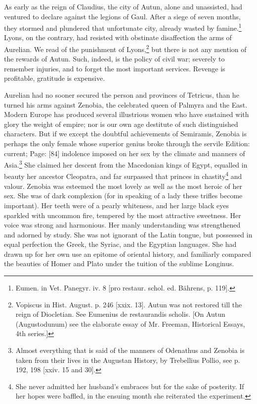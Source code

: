 As early as the reign of Claudius, the city of Autun, alone and unassisted, had ventured to declare against the legions of Gaul. After a siege of seven months, they stormed and plundered that unfortunate city, already wasted by famine.\footnote{Eumen. in Vet. Panegyr. iv. 8 [pro restaur. schol. ed. Bährens, p. 119].} Lyons, on the contrary, had resisted with obstinate disaffection the arms of Aurelian. We read of the punishment of Lyons,\footnote{Vopiscus in Hist. August. p. 246 [xxix. 13]. Autun was not restored till the reign of Diocletian. See Eumenius de restaurandis scholis. [On Autun (Augustodunum) see the elaborate essay of Mr. Freeman, Historical Essays, 4th series.]} but there is not any mention of the rewards of Autun. Such, indeed, is the policy of civil war; severely to remember injuries, and to forget the most important services. Revenge is profitable, gratitude is expensive.

Aurelian had no sooner secured the person and provinces of Tetricus, than he turned his arms against Zenobia, the celebrated queen of Palmyra and the East. Modern Europe has produced several illustrious women who have sustained with glory the weight of empire; nor is our own age destitute of such distinguished characters. But if we except the doubtful achievements of Semiramis, Zenobia is perhaps the only female whose superior genius broke through the servile Edition: current; Page: [84] indolence imposed on her sex by the climate and manners of Asia.\footnote{Almost everything that is said of the manners of Odenathus and Zenobia is taken from their lives in the Augustan History, by Trebellius Pollio, see p. 192, 198 [xxiv. 15 and 30].} She claimed her descent from the Macedonian kings of Egypt, equalled in beauty her ancestor Cleopatra, and far surpassed that princes in chastity\footnote{She never admitted her husband\texthebrew{}’s embraces but for the sake of posterity. If her hopes were baffled, in the ensuing month she reiterated the experiment.} and valour. Zenobia was esteemed the most lovely as well as the most heroic of her sex. She was of dark complexion (for in speaking of a lady these trifles become important). Her teeth were of a pearly whiteness, and her large black eyes sparkled with uncommon fire, tempered by the most attractive sweetness. Her voice was strong and harmonious. Her manly understanding was strengthened and adorned by study. She was not ignorant of the Latin tongue, but possessed in equal perfection the Greek, the Syriac, and the Egyptian languages. She had drawn up for her own use an epitome of oriental history, and familiarly compared the beauties of Homer and Plato under the tuition of the sublime Longinus.

